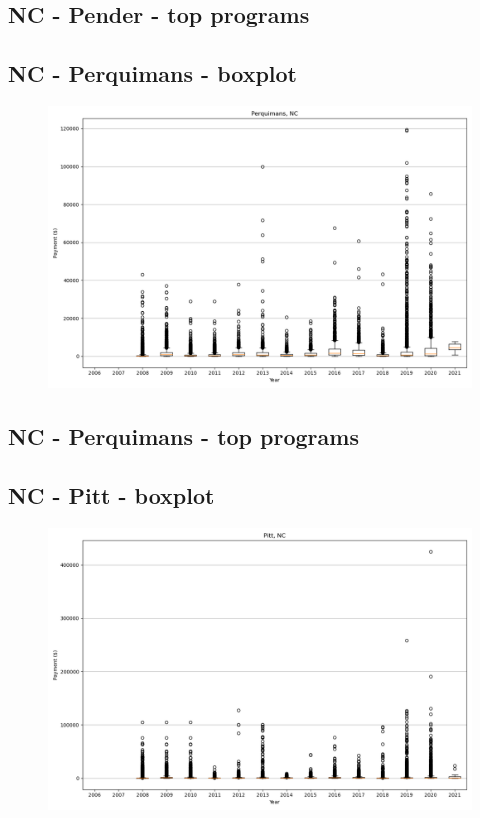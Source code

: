 \subsection*{NC - Pender - top programs}

\newpage
\subsection*{NC - Perquimans - boxplot}
\begin{figure}[h]
\centering
\includegraphics[width=7in]{../output/boxplots/counties/Perquimans-NC_boxplot.png}
\end{figure}


\subsection*{NC - Perquimans - top programs}

\newpage
\subsection*{NC - Pitt - boxplot}
\begin{figure}[h]
\centering
\includegraphics[width=7in]{../output/boxplots/counties/Pitt-NC_boxplot.png}
\end{figure}


